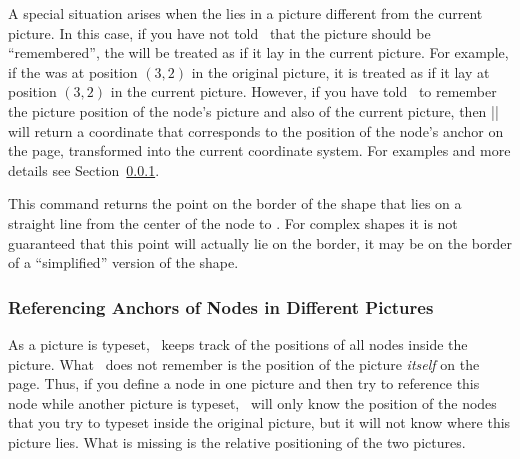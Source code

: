 \begin{command}{\pgfpointanchor{}}
    A special situation arises when the  lies in a picture different
    from the current picture. In this case, if you have not told \pgfname\ that
    the picture should be ``remembered'', the  will be treated as if
    it lay in the current picture. For example, if the  was at
    position $(3,2)$ in the original picture, it is treated as if it lay at
    position $(3,2)$ in the current picture. However, if you have told
    \pgfname\ to remember the picture position of the node's picture and also
    of the current picture, then |\pgfpointanchor| will return a coordinate
    that corresponds to the position of the node's anchor on the page,
    transformed into the current coordinate system. For examples and more
    details see Section~\ref{section-cross-pictures-pgf}.
\end{command}

\begin{command}{\pgfpointshapeborder{}}
    This command returns the point on the border of the shape that lies on a
    straight line from the center of the node to . For complex
    shapes it is not guaranteed that this point will actually lie on the
    border, it may be on the border of a ``simplified'' version of the shape.
\begin{codeexample}[]
\begin{pgfpicture}
  \begin{pgfscope}
  \end{pgfscope}
  \pgfpathcircle{\pgfpoint{2cm}{1cm}}{2pt}
  \pgfpathcircle{\pgfpoint{-1cm}{1cm}}{2pt}
\end{pgfpicture}
\end{codeexample}
\end{command}


\subsubsection{Referencing Anchors of Nodes in Different Pictures}
\label{section-cross-pictures-pgf}

As a picture is typeset, \pgfname\ keeps track of the positions of all nodes
inside the picture. What \pgfname\ does not remember is the position of the
picture \emph{itself} on the page. Thus, if you define a node in one picture
and then try to reference this node while another picture is typeset, \pgfname\
will only know the position of the nodes that you try to typeset inside the
original picture, but it will not know where this picture lies. What is missing
is the relative positioning of the two pictures.


